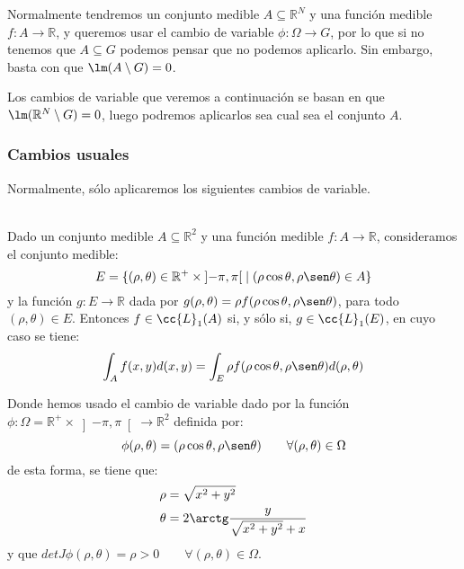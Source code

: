 Normalmente tendremos un conjunto medible $A\subseteq \mathbb{R}^N$ y una función medible $f:A\to \mathbb{R}$, y queremos usar el cambio de variable $\phi:\Omega\to G$, por lo que si no tenemos que $A\subseteq G$ podemos pensar que no podemos aplicarlo. Sin embargo, basta con que $\lm(A\setminus G)= 0$.

Los cambios de variable que veremos a continuación se basan en que ${\lm(\mathbb{R}^N\setminus G)= 0}$, luego podremos aplicarlos sea cual sea el conjunto $A$.

\subsubsection{Cambios usuales}
Normalmente, sólo aplicaremos los siguientes cambios de variable.

\begin{teo}\ \\
    Dado un conjunto medible $A\subseteq \mathbb{R}^2$ y una función medible $f:A\to \mathbb{R}$, consideramos el conjunto medible:
    \begin{equation*}
        E = \{(\rho, \theta)\in \mathbb{R}^+ \times \left]-\pi,\pi\right[ \mid (\rho\cos\theta, \rho\sen\theta)\in A\}
    \end{equation*}
    y la función $g:E\to \mathbb{R}$ dada por $g(\rho, \theta)=\rho f(\rho\cos\theta, \rho\sen\theta)$, para todo $(\rho, \theta)\in E$. Entonces $f\in \cc{L}_1(A)$ si, y sólo si, $g\in \cc{L}_1(E)$, en cuyo caso se tiene:
    \begin{equation*}
        \int_A f(x,y)d(x,y) = \int_E \rho f(\rho\cos\theta, \rho\sen\theta)d(\rho,\theta)
    \end{equation*}
\end{teo}

Donde hemos usado el cambio de variable dado por la función\newline ${\phi:\Omega=\mathbb{R}^+ \times \left]-\pi,\pi\right[ \to \mathbb{R}^2}$ definida por:
\begin{equation*}
    \phi(\rho,\theta) = (\rho\cos\theta, \rho\sen\theta)\qquad \forall (\rho,\theta)\in \Omega
\end{equation*}
de esta forma, se tiene que:
\begin{align*}
    \rho &= \sqrt{x^2+y^2} \\
    \theta &= 2\arctg \dfrac{y}{\sqrt{x^2+y^2}+x}
\end{align*}
y que $detJ\phi(\rho,\theta)=\rho >0\qquad \forall (\rho, \theta)\in \Omega$.\\

